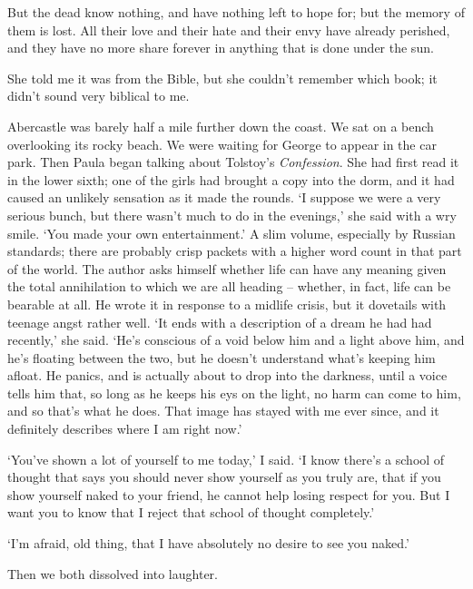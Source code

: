 \begin{quoting}
    But the dead know nothing, and have nothing left to hope for; but the memory of them is lost. All their love and their hate and their envy have already perished, and they have no more share forever in anything that is done under the sun.
\end{quoting}

She told me it was from the Bible, but she couldn't remember which book; it didn't sound very biblical to me.

Abercastle was barely half a mile further down the coast. We sat on a bench overlooking its rocky beach. We were waiting for George to appear in the car park. Then Paula began talking about Tolstoy's \textit{Confession}. She had first read it in the lower sixth; one of the girls had brought a copy into the dorm, and it had caused an unlikely sensation as it made the rounds. `I suppose we were a very serious bunch, but there wasn't much to do in the evenings,' she said with a wry smile. `You made your own entertainment.' A slim volume, especially by Russian standards; there are probably crisp packets with a higher word count in that part of the world. The author asks himself whether life can have any meaning given the total annihilation to which we are all heading -- whether, in fact, life can be bearable at all. He wrote it in response to a midlife crisis, but it dovetails with teenage angst rather well. `It ends with a description of a dream he had had recently,' she said. `He's conscious of a void below him and a light above him, and he's floating between the two, but he doesn't understand what's keeping him afloat. He panics, and is actually about to drop into the darkness, until a voice tells him that, so long as he keeps his eys on the light, no harm can come to him, and so that's what he does. That image has stayed with me ever since, and it definitely describes where I am right now.'

`You've shown a lot of yourself to me today,' I said. `I know there's a school of thought that says you should never show yourself as you truly are, that if you show yourself naked to your friend, he cannot help losing respect for you. But I want you to know that I reject that school of thought completely.'

`I'm afraid, old thing, that I have absolutely no desire to see you naked.'

Then we both dissolved into laughter.

\section{}


